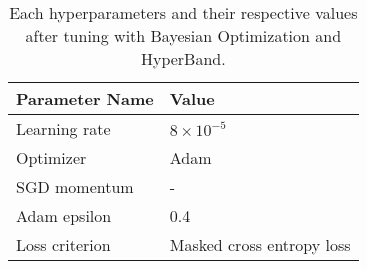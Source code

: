 \begin{table}[]
	\centering
\begin{tabular}{@{}lp{2.3cm}}
\toprule
Parameter Name    & Value     \\ \midrule
Learning rate     & $8 \times 10^{-5}$    \\
Optimizer         & Adam      \\
SGD momentum      & -         \\
Adam epsilon      & 0.4       \\
Loss criterion    & Masked cross entropy loss\\ \bottomrule
\end{tabular}
\caption[Hyperparameter Optimization Results]{Each hyperparameters and their respective values after tuning with Bayesian Optimization and HyperBand.}
\label{tab:hyperparameterresults}
\end{table}